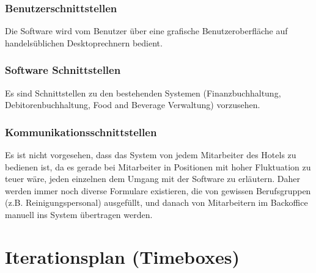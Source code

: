 \documentclass[10pt,a4paper,titlepage]{article}
\begin{document}
\subsubsection{Benutzerschnittstellen}
Die Software wird vom Benutzer über eine grafische Benutzeroberfläche auf handelsüblichen Desktoprechnern bedient.
\subsubsection{Software Schnittstellen}
Es sind Schnittstellen zu den bestehenden Systemen (Finanzbuchhaltung, Debitorenbuchhaltung, Food and Beverage Verwaltung) vorzusehen.
\subsubsection{Kommunikationsschnittstellen}
Es ist nicht vorgesehen, dass das System von jedem Mitarbeiter des Hotels zu bedienen ist, da es gerade bei Mitarbeiter in Positionen mit hoher Fluktuation zu teuer wäre, jeden einzelnen dem Umgang mit der Software zu erläutern. Daher werden immer noch diverse Formulare existieren, die von gewissen Berufsgruppen (z.B. Reinigungspersonal) ausgefüllt, und danach von Mitarbeitern im Backoffice manuell ins System übertragen werden.

\newpage

\section{Iterationsplan (Timeboxes)}

\newpage

\printglossary[title=Glossar,toctitle=GLOSSAR]
\end{document}

